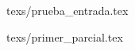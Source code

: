 \documentclass[11pt,fleqn]{book} %
\begin{document}
{texs/prueba_entrada.tex}

{texs/primer_parcial.tex}










\end{document}
